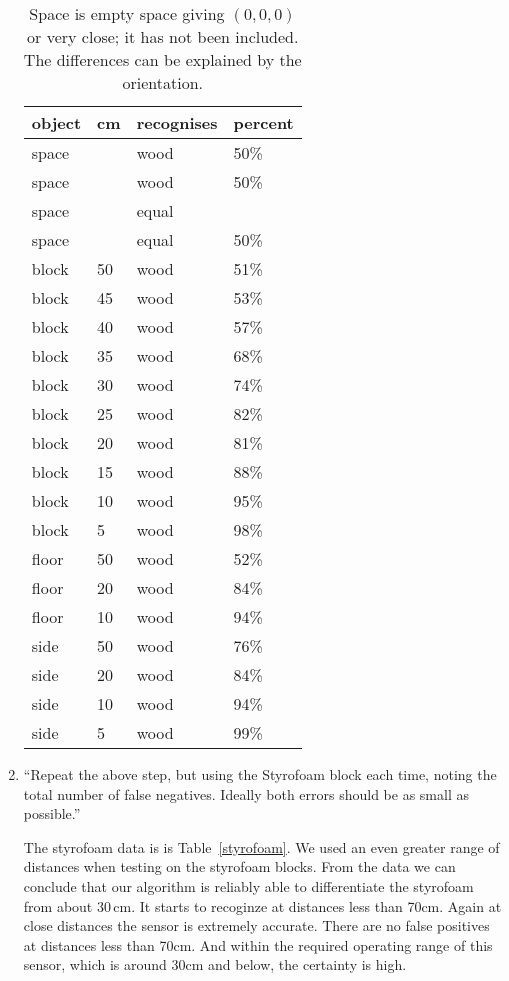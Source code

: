 \documentclass[twocolumn]{article}
\begin{document}
\begin{enumerate}
\begin{table}[htb]\footnotesize
\begin{center}\begin{tabular}{llll}
object& cm& recognises& percent \\
\hline
space&   & wood& 50\% \\
space&   & wood& 50\% \\
space&   & equal& \\
space&   & equal& 50\% \\
\hline
block& 50& wood& 51\% \\
block& 45& wood& 53\% \\
block& 40& wood& 57\% \\
block& 35& wood& 68\% \\
block& 30& wood& 74\% \\
block& 25& wood& 82\% \\
block& 20& wood& 81\% \\
block& 15& wood& 88\% \\
block& 10& wood& 95\% \\
block&  5& wood& 98\% \\
floor& 50& wood& 52\% \\
floor& 20& wood& 84\% \\
floor& 10& wood& 94\% \\
side& 50& wood& 76\% \\
side& 20& wood& 84\% \\
side& 10& wood& 94\% \\
side&  5& wood& 99\% \\
\end{tabular}\end{center}
\caption{Space is empty space giving $(0,0,0)$ or very close;
it has not been included. The differences can be explained by the orientation.}
\label{wood}
\end{table}

\item
``Repeat the above step, but using the Styrofoam block each time, noting the total number of false negatives. Ideally both errors should be as small as possible.\cite{lab5}''

The styrofoam data is is Table~\ref{styrofoam}. We used an even greater range of distances when testing on the styrofoam blocks. From the data we can conclude that our algorithm is reliably able to differentiate the styrofoam from about 30\,cm. It starts to recoginze at distances less than 70cm. Again at close distances the sensor is extremely accurate. There are no false positives at distances less than 70cm. And within the required operating range of this sensor, which is around 30cm and below, the certainty is high. 


\end{enumerate}
\end{document}
